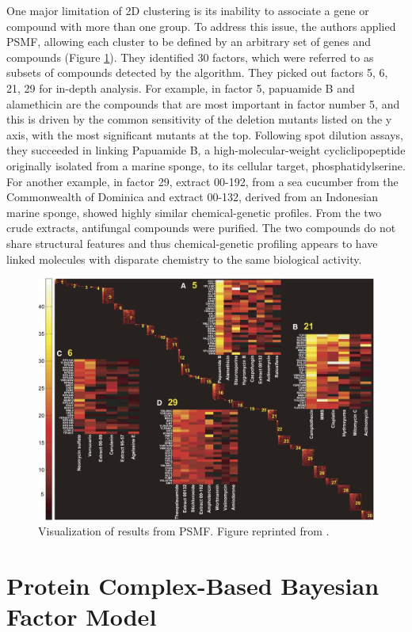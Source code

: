 \documentclass[12pt,conference,compsocconf]{../IEEEtran}
\begin{document}
One major limitation of 2D clustering is its inability to associate a gene or compound with more than one group. To address this issue, the authors applied PSMF, allowing each cluster to be defined by an arbitrary set of genes and compounds (Figure \ref{fig:1078-2}). They identified 30 factors, which were referred to as subsets of compounds detected by the algorithm. They picked out factors 5, 6, 21, 29 for in-depth analysis. For example, in factor 5, papuamide B and alamethicin are the compounds that are most important in factor number 5, and this is driven by the common sensitivity of the deletion mutants listed on the y axis, with the most significant mutants at the top. Following spot dilution assays, they succeeded in linking Papuamide B, a high-molecular-weight cycliclipopeptide originally isolated from a marine sponge, to its cellular target, phosphatidylserine. For another example, in factor 29, extract 00-192, from a sea cucumber from the Commonwealth of Dominica and extract 00-132, derived from an Indonesian marine sponge, showed highly similar chemical-genetic profiles. From the two crude extracts, antifungal compounds were purified. The two compounds do not share structural features and thus chemical-genetic profiling appears to have linked molecules with disparate chemistry to the same biological activity.

\begin{figure}
\centering
\includegraphics[width=\linewidth]{1078-2.png}
\caption{Visualization of results from PSMF. Figure reprinted from \citep{1078}.}
\label{fig:1078-2}
\end{figure}


\section{Protein Complex-Based Bayesian Factor Model}
\end{document}
